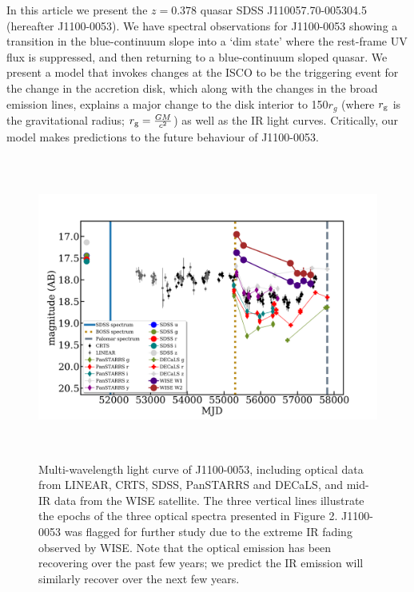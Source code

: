 \documentclass{nature}
\begin{document}
In this article we present the $z=0.378$ quasar SDSS
J110057.70-005304.5 (hereafter J1100-0053). 
We have spectral observations for  J1100-0053 showing a transition in the blue-continuum slope
into a `dim state' where the rest-frame
UV flux is suppressed, and then returning to a blue-continuum sloped
quasar.  We present a model that invokes changes at the ISCO to be the
triggering event for the change in the accretion disk, which along
with the changes in the broad emission lines, explains a major change
to the disk interior to 150$r_{g}$ (where $r_{\rm g}$ is the
gravitational radius; $r_{\rm g}=\frac{GM}{c^2}$) as well as the IR
light curves. Critically, our model makes predictions to the future
behaviour of J1100-0053.


 
\begin{figure}
  \centering
  \includegraphics[width=16.00cm, height=10.00cm, trim=0.0cm 0.0cm 0.0cm 0.0cm, clip]
  {../plots/lc/J110057_lc_20171204v1.png}
  \caption[]{
    Multi-wavelength light curve of J1100-0053,
    including optical data from LINEAR, CRTS, SDSS, PanSTARRS and
    DECaLS, and mid-IR data from the WISE satellite.  The three vertical
    lines illustrate the epochs of the three optical spectra presented
    in Figure 2.  J1100-0053 was flagged for further study due to the
    extreme IR fading observed by WISE.  Note that the optical emission
    has been recovering over the past few years; we predict the IR
    emission will similarly recover over the next few years.}
  \label{fig:J110057_LC_CRTS}
\end{figure}
\end{document}
